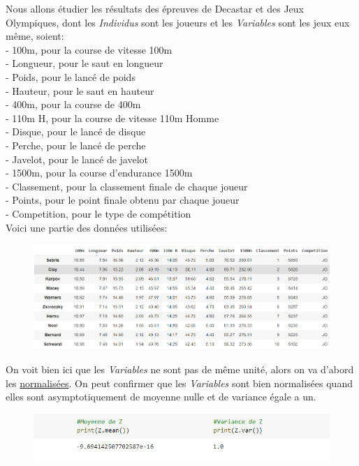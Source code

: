 \documentclass{article}
\begin{document}
Nous allons étudier les résultats des épreuves de Decastar et des Jeux Olympiques, dont les \textit{Individus} sont les joueurs et les \textit{Variables} sont les jeux eux même, soient:
\newline
\\
- 100m, pour la course de vitesse 100m \\
- Longueur, pour le saut en longueur \\
- Poids, pour le lancé de poids \\
- Hauteur, pour le saut en hauteur \\
- 400m, pour la course de 400m \\
- 110m H, pour la course de vitesse 110m Homme \\
- Disque, pour le lancé de disque \\
- Perche, pour le lancé de perche \\
- Javelot, pour le lancé de javelot \\
- 1500m, pour la course d'endurance 1500m \\
- Classement, pour la classement finale de chaque joueur \\
- Points, pour le point finale obtenu par chaque joueur \\
- Competition, pour le type de compétition \\

Voici une partie des données utilisées:

\begin{figure}[h!]
\includegraphics[width=\linewidth]{images/data_initials.png}
\end{figure}

On voit bien ici que les \textit{Variables} ne sont pas de même unité, alors on va d'abord les \underline{normalisées}. On peut confirmer que les \textit{Variables} sont bien normalisées quand elles sont asymptotiquement de moyenne nulle et de variance égale a un.

\begin{figure}[h!]
\includegraphics[width=\linewidth]{images/mean_variance.png}
\end{figure}
\end{document}
